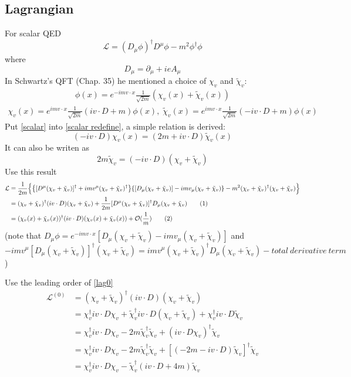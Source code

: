 \documentclass{article}
\newcommand{\lag}{\mathcal{L}}
\begin{document}
 \subsection{Lagrangian}
For scalar QED
$$\mathcal{L}=(D_{\mu}\phi)^{\dagger}D^{\mu}\phi-m^2\phi^{\dagger}\phi$$
where
$$D_{\mu}=\partial_{\mu}+ieA_{\mu}$$
In Schwartz's QFT (Chap. 35) he mentioned a choice of $\chi_v$ and $\tilde \chi_v$:
\begin{align}
\phi(x)=e^{-imv\cdot x}\frac{1}{\sqrt{2m}}(\chi_v(x)+\tilde\chi_v(x))
\label{scalar}
\end{align}
\begin{align}
\chi_v(x)=e^{imv\cdot x}\frac{1}{\sqrt{2m}}(iv\cdot D+m)\phi(x),\;
\tilde\chi_v(x)=e^{imv\cdot x}\frac{1}{\sqrt{2m}}(-iv\cdot D+m)\phi(x)
\label{scalar redefine}
\end{align}
Put \eqref{scalar} into \eqref{scalar redefine}, a simple relation is derived:
$$(-iv\cdot D)\chi_v(x)=(2m+iv\cdot D)\tilde\chi_v(x)$$
It can also be writen as
$$2m\tilde\chi_v=(-iv\cdot D)(\chi_v+\tilde\chi_v) $$
Use this result
\begin{align*}
  \mathcal{L}&=\frac{1}{2m}\Big\{\Bqty{[D^{\mu}(\chi_v+\tilde\chi_v)]^{\dagger}+imv^{\mu}(\chi_v+\tilde\chi_v)^{\dagger}}\Bqty{[D_{\mu}(\chi_v+\tilde\chi_v)]-imv_{\mu}(\chi_v+\tilde\chi_v)}-m^2(\chi_v+\tilde\chi_v)^{\dagger}(\chi_v+\tilde\chi_v)\Big\}\\
  &=(\chi_v+\tilde\chi_v)^{\dagger}(iv\cdot D)(\chi_v+\tilde\chi_v)+\frac{1}{2m}[D^{\mu}(\chi_v+\tilde\chi_v)]^{\dagger}D_{\mu}(\chi_v+\tilde\chi_v)
  \stepcounter{equation}\tag{\theequation}\label{lag0}\\
&=(\chi_v(x)+\tilde\chi_v(x))^{\dagger}(iv\cdot D)(\chi_v(x)+\tilde\chi_v(x))+\mathcal{O}(\frac{1}{m}) \stepcounter{equation}\tag{\theequation}\label{lag1}
\end{align*}
(note that $D_{\mu}\phi=e^{-imv\cdot x}[D_{\mu}(\chi_v+\tilde \chi_v)-imv_{\mu}(\chi_v+\tilde\chi_v)]$ and $-imv^{\mu}[D_{\mu}(\chi_v+\tilde \chi_v)]^{\dagger}(\chi_v+\tilde \chi_v)=imv^{\mu}(\chi_v+\tilde\chi_v)^{\dagger}D_{\mu}(\chi_v+\tilde \chi_v)-total\ derivative\ term$)

Use the leading order of \eqref{lag0}
\begin{align*}
  \lag^{(0)}&=(\chi_v+\tilde\chi_v)^{\dagger}(iv\cdot D)(\chi_v+\tilde\chi_v)\\
  &=\chi_v^{\dagger}iv\cdot D\chi_v+\tilde\chi_v^{\dagger}iv\cdot D(\chi_v+\tilde\chi_v)+\chi_v^{\dagger}iv\cdot D\tilde\chi_v\\
  &=\chi_v^{\dagger}iv\cdot D\chi_v-2m\tilde\chi_v^{\dagger}\tilde\chi_v+(iv\cdot D\chi_v)^{\dagger}\tilde\chi_v\\
&=\chi_v^{\dagger}iv\cdot D\chi_v-2m\tilde\chi_v^{\dagger}\tilde\chi_v+[(-2m-iv\cdot D)\tilde\chi_v]^{\dagger}\tilde\chi_v\\
&=\chi_v^{\dagger}iv\cdot D\chi_v-\tilde\chi_v^{\dagger}(iv\cdot D+4m)\tilde\chi_v
\end{align*}
\end{document}
